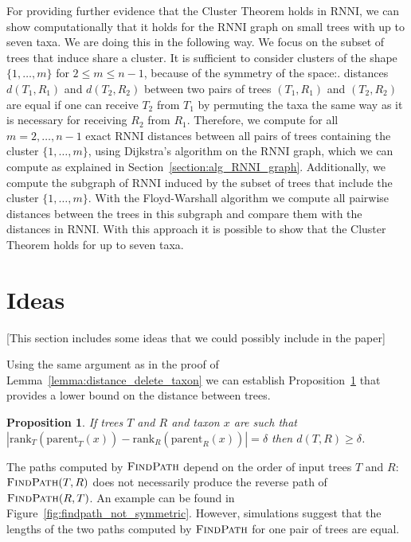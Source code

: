 \documentclass{amsart}
\newcommand{\parent}{\mathrm{parent}}
\newcommand{\rank}{\mathrm{rank}}
\newcommand{\rnni}{\mathrm{RNNI}}
\newcommand{\findpath}{\textsc{FindPath}}
\newtheorem{proposition}[definition]{Proposition}
\begin{document}
For providing further evidence that the Cluster Theorem holds in $\rnni$, we can show computationally that it holds for the $\rnni$ graph on small trees with up to seven taxa.
We are doing this in the following way.
We focus on the subset of trees that induce share a cluster.
It is sufficient to consider clusters of the shape $\{1, \ldots, m\}$ for $2 \leq m \leq n-1$, because of the symmetry of the space:.
distances $d(T_1,R_1)$ and $d(T_2,R_2)$ between two pairs of trees $(T_1,R_1)$ and $(T_2,R_2)$ are equal if one can receive $T_2$ from $T_1$ by permuting the taxa the same way as it is necessary for receiving $R_2$ from $R_1$.
Therefore, we compute for all $m = 2, \ldots, n-1$ exact $\rnni$ distances between all pairs of trees containing the cluster $\{1, \ldots, m\}$, using Dijkstra's algorithm \autocite{Dijkstra1959-ph} on the $\rnni$ graph, which we can compute as explained in Section~\ref{section:alg_RNNI_graph}.
Additionally, we compute the subgraph of $\rnni$ induced by the subset of trees that include the cluster $\{1, \ldots, m\}$.
With the Floyd-Warshall algorithm we compute all pairwise distances between the trees in this subgraph and compare them with the distances in $\rnni$.
With this approach it is possible to show that the Cluster Theorem holds for up to seven taxa.


\section{Ideas}

[This section includes some ideas that we could possibly include in the paper]

Using the same argument as in the proof of Lemma~\ref{lemma:distance_delete_taxon} we can establish Proposition~\ref{proposition:lower_bound_distance} that provides a lower bound on the distance between trees.

\begin{proposition}
If trees $T$ and $R$ and taxon $x$ are such that $|\rank_T(\parent_T(x)) - \rank_R(\parent_R(x))| = \delta$ then $d(T,R) \geq \delta$.
\label{proposition:lower_bound_distance}
\end{proposition}


The paths computed by $\findpath$ depend on the order of input trees $T$ and $R$:
$\findpath(T,R)$ does not necessarily produce the reverse path of $\findpath(R,T)$.
An example can be found in Figure~\ref{fig:findpath_not_symmetric}.
However, simulations suggest that the lengths of the two paths computed by $\findpath$ for one pair of trees are equal.
\end{document}

